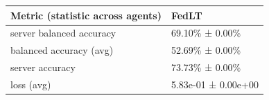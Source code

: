 \begin{tabular}{ll}
\hline
 Metric (statistic across agents)   & FedLT               \\
\hline
 server balanced accuracy           & 69.10\% ± 0.00\%      \\
 balanced accuracy (avg)            & 52.69\% ± 0.00\%      \\
 server accuracy                    & 73.73\% ± 0.00\%      \\
 loss (avg)                         & 5.83e-01 ± 0.00e+00 \\
\hline
\end{tabular}